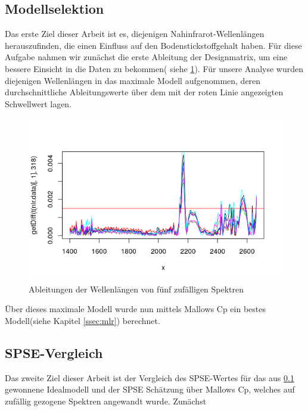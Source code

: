 	\subsection{Modellselektion}
	\label{ssec:modellselektion}
	Das erste Ziel dieser Arbeit ist es, diejenigen Nahinfrarot-Wellenlängen herauszufinden, die einen Einfluss auf den Bodenstickstoffgehalt haben.
	Für diese Aufgabe nahmen wir zunächst die erste Ableitung der Designmatrix, um eine bessere Einsicht in die Daten zu bekommen( siehe \ref{Wellenlängen_erste_Ableitung}). Für unsere Analyse wurden diejenigen Wellenlängen in das maximale Modell aufgenommen, deren durchschnittliche Ableitungswerte über dem mit der roten Linie angezeigten Schwellwert lagen. 
	\begin{figure}
		\label{Wellenlängen_erste_Ableitung}
		\includegraphics[width=\textwidth]{img/wave_1dev.png}
		\caption{Ableitungen der Wellenlängen von fünf zufälligen Spektren}
	\end{figure}
	Über dieses maximale Modell wurde nun mittels Mallows Cp ein bestes Modell(siehe Kapitel \ref{ssec:mlr}) berechnet.
	
	\subsection{SPSE-Vergleich}
	Das zweite Ziel dieser Arbeit ist der Vergleich des SPSE-Wertes für das aus \ref{ssec:modellselektion} gewonnene Idealmodell und der SPSE Schätzung über Mallows Cp, welches auf zufällig gezogene Spektren angewandt wurde. 
	Zunächst 

	
	
	
		
		
